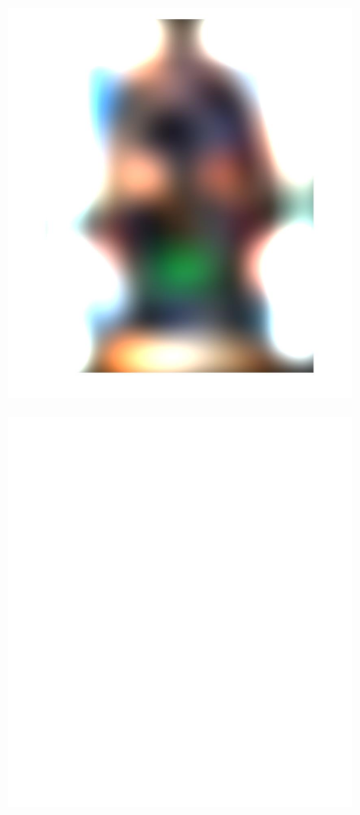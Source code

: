 \documentclass[a4paper]{iacas}
\begin{document}
\begin{figure}[!htbp]
\begin{subfigure}[b]{0.15\textwidth}
		\caption{}
		\label{fig:154}
	\end{subfigure}
	\begin{subfigure}[b]{0.15\textwidth}
		\includegraphics[width=\textwidth]{155.jpg}
		\caption{}
		\label{fig:155}
	\end{subfigure}
	\begin{subfigure}[b]{0.15\textwidth}
		\includegraphics[width=\textwidth]{156.jpg}
		\caption{}
		\label{fig:156}
	\end{subfigure}
	

\end{figure}
\end{document}
